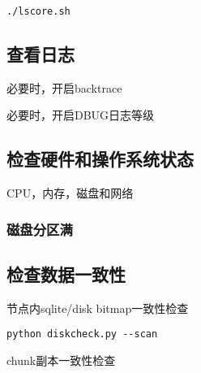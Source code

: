 \begin{lstlisting}
./lscore.sh
\end{lstlisting}

\subsection{查看日志}

必要时，开启backtrace

必要时，开启DBUG日志等级

\subsection{检查硬件和操作系统状态}

CPU，内存，磁盘和网络

\subsubsection{磁盘分区满}




\subsection{检查数据一致性}

节点内sqlite/disk bitmap一致性检查

\begin{lstlisting}
python diskcheck.py --scan
\end{lstlisting}

chunk副本一致性检查
